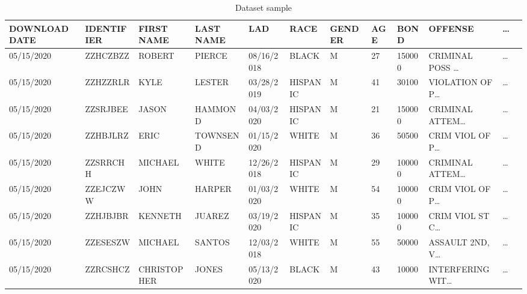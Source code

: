 \vspace{2em}
\begin{table*}[!ht]
  \caption{Dataset sample}
  \label{tab:dataset}
  \centering
  \begin{adjustbox}{max totalsize={.99\linewidth}{\textheight},center}
    \bgroup
    \def\arraystretch{1.5}
    \begin{tabular}{|l|l|l|l|l|l|l|l|l|l|l|l|}
      \hline
      \textbf{DOWNLOAD DATE} & \textbf{IDENTIFIER} & \textbf{FIRST NAME} & \textbf{LAST NAME} & \textbf{LAD} & \textbf{RACE} & \textbf{GENDER} & \textbf{AGE} & \textbf{BOND} & \textbf{OFFENSE}     & \textbf{\dots} \\ \hline
      05/15/2020             & ZZHCZBZZ            & ROBERT              & PIERCE             & 08/16/2018   & BLACK         & M               & 27           & 150000        & CRIMINAL POSS \dots  & \dots          \\ \hline
      05/15/2020             & ZZHZZRLR            & KYLE                & LESTER             & 03/28/2019   & HISPANIC      & M               & 41           & 30100         & VIOLATION OF P\dots  & \dots          \\ \hline
      05/15/2020             & ZZSRJBEE            & JASON               & HAMMOND            & 04/03/2020   & HISPANIC      & M               & 21           & 150000        & CRIMINAL ATTEM\dots  & \dots          \\ \hline
      05/15/2020             & ZZHBJLRZ            & ERIC                & TOWNSEND           & 01/15/2020   & WHITE         & M               & 36           & 50500         & CRIM VIOL OF P\dots  & \dots          \\ \hline
      05/15/2020             & ZZSRRCHH            & MICHAEL             & WHITE              & 12/26/2018   & HISPANIC      & M               & 29           & 100000        & CRIMINAL ATTEM\dots  & \dots          \\ \hline
      05/15/2020             & ZZEJCZWW            & JOHN                & HARPER             & 01/03/2020   & WHITE         & M               & 54           & 100000        & CRIM VIOL OF P\dots  & \dots          \\ \hline
      05/15/2020             & ZZHJBJBR            & KENNETH             & JUAREZ             & 03/19/2020   & HISPANIC      & M               & 35           & 100000        & CRIM VIOL ST C\dots  & \dots          \\ \hline
      05/15/2020             & ZZESESZW            & MICHAEL             & SANTOS             & 12/03/2018   & WHITE         & M               & 55           & 50000         & ASSAULT 2ND, V\dots  & \dots          \\ \hline
      05/15/2020             & ZZRCSHCZ            & CHRISTOPHER         & JONES              & 05/13/2020   & BLACK         & M               & 43           & 10000         & INTERFERING WIT\dots & \dots          \\ \hline
    \end{tabular}
    \egroup
  \end{adjustbox}

\end{table*}
